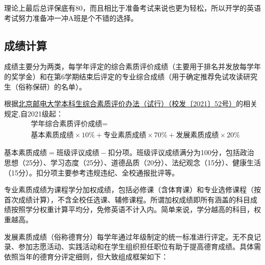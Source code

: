 理论上最后总评保底有80，而且相比于准备考试来说也更为轻松，所以开学的英语考试努力准备冲一冲A班是个不错的选择。

\subsection{成绩计算}


成绩主要分为两类，每学年评定的综合素质评价成绩（主要用于排名并发放每学年的奖学金）和在第6学期结束后评定的专业综合成绩（用于确定推荐免试攻读研究生（俗称保研）的名单）。

根据\href{http://my.bupt.edu.cn/content.jsp?urltype=news.NewsContentUrl&wbtreeid=1025&wbnewsid=95500}{北京邮电大学本科生综合素质评价办法（试行）（校发〔2021〕52号）}的相关规定,自2021级起：
\begin{equation*}
    \begin{aligned}
        &\text{学年综合素质评价成绩}=\\
        &\text{基本素质成绩}\times10\%+\text{专业素质成绩}\times70\%+\text{发展素质成绩}\times20\%
    \end{aligned}
\end{equation*}

$\text{基本素质成绩}=\text{班级评议成绩}-\text{扣分项}$。班级评议成绩满分为100分，包括政治思想（25分）、学习态度（25分）、道德品质（20分）、法纪观念（15分）、健康生活（15分）。扣分项主要参考违规违纪、全校通报批评等。

专业素质成绩为课程学分加权成绩，包括必修课（含体育课）和专业选修课程（按首次成绩计算），不含全校任选课、辅修课程。所谓加权成绩即所有涵盖的科目成绩按照学分权重计算平均分，免修英语不计入内。简单来说，学分越高的科目，权重越高。

发展素质成绩（俗称德育分）每学年通过年级制定的统一标准进行评定。无不良记录、参加志愿活动、实践活动和在学生组织担任职位有助于提高德育成绩。具体需依照当年的德育分评定细则，但大致组成框架如下：

